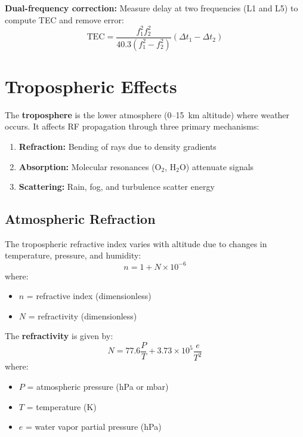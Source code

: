 \textbf{Dual-frequency correction:} Measure delay at two frequencies (L1 and L5) to compute TEC and remove error:
\begin{equation}
\text{TEC} = \frac{f_1^2 f_2^2}{40.3(f_1^2 - f_2^2)}(\Delta t_1 - \Delta t_2)
\end{equation}

\section{Tropospheric Effects}

The \textbf{troposphere} is the lower atmosphere (0--15~km altitude) where weather occurs. It affects RF propagation through three primary mechanisms:

\begin{enumerate}
\item \textbf{Refraction:} Bending of rays due to density gradients
\item \textbf{Absorption:} Molecular resonances (O$_2$, H$_2$O) attenuate signals
\item \textbf{Scattering:} Rain, fog, and turbulence scatter energy
\end{enumerate}

\subsection{Atmospheric Refraction}

The tropospheric refractive index varies with altitude due to changes in temperature, pressure, and humidity:
\begin{equation}
n = 1 + N \times 10^{-6}
\end{equation}
where:
\begin{itemize}
\item $n$ = refractive index (dimensionless)
\item $N$ = refractivity (dimensionless)
\end{itemize}

The \textbf{refractivity} is given by:
\begin{equation}
N = 77.6 \frac{P}{T} + 3.73 \times 10^5 \frac{e}{T^2}
\end{equation}
where:
\begin{itemize}
\item $P$ = atmospheric pressure (hPa or mbar)
\item $T$ = temperature (K)
\item $e$ = water vapor partial pressure (hPa)
\end{itemize}

